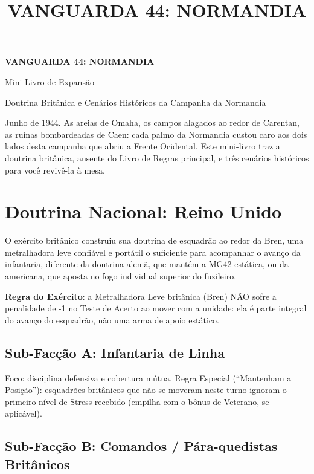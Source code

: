 \documentclass[11pt]{article}
\title{\bfseries\color{vinho}\Huge VANGUARDA 44: NORMANDIA}
\author{}
\date{}
\begin{document}
\begin{titlepage}
\centering
\vspace*{3cm}
{\Huge\bfseries\color{vinho} VANGUARDA 44: NORMANDIA \par}
\vspace{0.5cm}
{\Large\color{mostarda} Mini-Livro de Expansão \par}
\vspace{2cm}
{\large Doutrina Britânica e Cenários Históricos da Campanha da Normandia \par}
\vfill
\end{titlepage}

\tableofcontents

\bigskip

Junho de 1944. As areias de Omaha, os campos alagados ao redor de Carentan, as ruínas bombardeadas de Caen: cada palmo da Normandia custou caro aos dois lados desta campanha que abriu a Frente Ocidental. Este mini-livro traz a doutrina britânica, ausente do Livro de Regras principal, e três cenários históricos para você revivê-la à mesa.

\section{Doutrina Nacional: Reino Unido}

O exército britânico construiu sua doutrina de esquadrão ao redor da Bren, uma metralhadora leve confiável e portátil o suficiente para acompanhar o avanço da infantaria, diferente da doutrina alemã, que mantém a MG42 estática, ou da americana, que aposta no fogo individual superior do fuzileiro.

\textbf{Regra do Exército}: a Metralhadora Leve britânica (Bren) NÃO sofre a penalidade de -1 no Teste de Acerto ao mover com a unidade: ela é parte integral do avanço do esquadrão, não uma arma de apoio estático.

\subsection{Sub-Facção A: Infantaria de Linha}

Foco: disciplina defensiva e cobertura mútua. Regra Especial (``Mantenham a Posição''): esquadrões britânicos que não se moveram neste turno ignoram o primeiro nível de Stress recebido (empilha com o bônus de Veterano, se aplicável).

\subsection{Sub-Facção B: Comandos / Pára-quedistas Britânicos}
\end{document}
